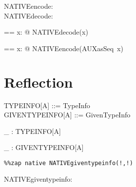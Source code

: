 \documentclass{article}
\begin{document}
\begin{zed}
  [\denotation]
\end{zed}


\begin{axdef}
  NATIVEencode: \assumed \seq \nat \pfun \denotation \\
  NATIVEdecode: \assumed \denotation \fun \seq \nat
\end{axdef}


\begin{axdef}
  \ddec == \lambda x: \assumed \denotation @ NATIVEdecode(x)
\end{axdef}

\begin{axdef}
  \denc == 
    \lambda x: \assumed \seq \nat @ NATIVEencode(AUXasSeq~x)
\end{axdef}


\section{Reflection}

\begin{zed}
  TYPEINFO[A] ::= TypeInfo \ldata \denotation \rdata \\
  GIVENTYPEINFO[A] ::= GivenTypeInfo \ldata \denotation \rdata
\end{zed}


\begin{axdef}[A]
  \typeinfo \_ : TYPEINFO[A] \\
\end{axdef}

\begin{axdef}[A]
  \giventypeinfo \_ : GIVENTYPEINFO[A]
\end{axdef}

\begin{verbatim}
%%zap native NATIVEgiventypeinfo(!,!) 
\end{verbatim}

\begin{axdef}
  NATIVEgiventypeinfo: \assumed \denotation \cross \denotation \fun \denotation
\end{axdef}


\end{document}
